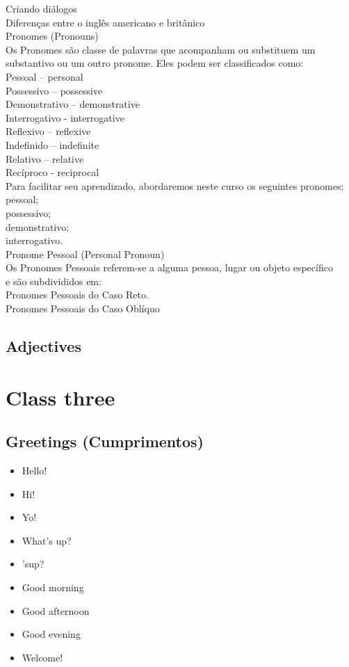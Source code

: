 \documentclass[12pt,a4paper]{article} %
\begin{document}
Criando diálogos\\

	Diferenças entre o inglês americano e britânico\\

	Pronomes (Pronouns)\\
		Os Pronomes são classe de palavras que acompanham ou substituem um substantivo ou um outro pronome. Eles 	podem ser classificados como:\\
		Pessoal – personal\\
		Possessivo – possessive\\
		Demonstrativo – demonstrative\\
		Interrogativo - interrogative\\
		Reflexivo – reflexive\\
		Indefinido – indefinite\\
		Relativo – relative\\
		Recíproco - reciprocal\\
		
	Para facilitar seu aprendizado, abordaremos neste curso os seguintes pronomes:\\
		pessoal;\\
		possessivo;\\
		demonstrativo;\\
		interrogativo.\\
		Pronome Pessoal (Personal Pronoun)\\
		Os Pronomes Pessoais referem-se a alguma pessoa, lugar ou objeto específico\\
		e são subdivididos em:\\
		Pronomes Pessoais do Caso Reto.\\
		Pronomes Pessoais do Caso Oblíquo\\
\subsection{Adjectives}


\section{Class three}
\subsection{Greetings (Cumprimentos)}
	\begin{itemize}
		\item Hello!
		\item Hi!
		\item Yo!
		\item What's up?
		\item 'sup?
		\item Good morning
		\item Good afternoon
		\item Good evening
		\item Welcome!
	\end{itemize}
\end{document}
